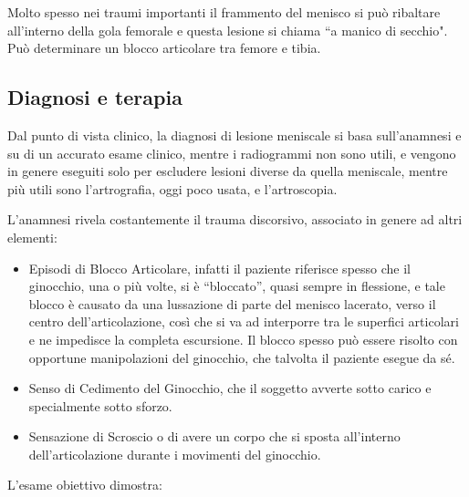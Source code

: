 Molto spesso nei traumi importanti il frammento del menisco si può ribaltare all'interno della gola femorale e questa lesione si chiama ``a manico di secchio". Può determinare un blocco articolare tra femore e tibia.

\subsection{Diagnosi e terapia}

Dal punto di vista clinico, la diagnosi di lesione meniscale si basa sull'anamnesi e su di un accurato esame clinico, mentre i radiogrammi non sono utili, e vengono in genere eseguiti solo per escludere lesioni
diverse da quella meniscale, mentre più utili sono l'artrografia, oggi poco usata, e l'artroscopia.

L'anamnesi rivela costantemente il trauma discorsivo, associato in genere ad altri elementi:

\begin{itemize}
\item
  Episodi di Blocco Articolare, infatti il paziente riferisce spesso che il ginocchio, una o più volte, si è ``bloccato'', quasi sempre in flessione, e tale blocco è causato da una lussazione di parte del menisco lacerato, verso il centro dell'articolazione, così che si va ad interporre tra le superfici articolari e ne impedisce la completa escursione. Il blocco spesso può essere risolto con opportune manipolazioni del ginocchio, che talvolta il paziente esegue da sé.
\item
  Senso di Cedimento del Ginocchio, che il soggetto avverte sotto carico e specialmente sotto sforzo.
\item
  Sensazione di Scroscio o di avere un corpo che si sposta all'interno dell'articolazione durante i movimenti del ginocchio.
\end{itemize}

L'esame obiettivo dimostra:

